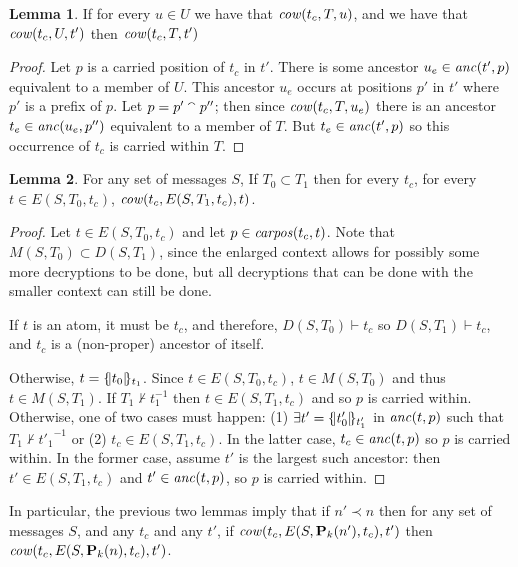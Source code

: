 \documentclass[12pt]{article}
\theoremstyle{definition}
\newtheorem{lem}{Lemma}[section]
\newcommand{\pubmsg}{\mathbf{P}}
\newcommand{\anc}{\fn{anc}}
\newcommand{\mcow}{\fn{cow}}
\begin{document}
\begin{lem}
\label{lem:cowtrans}
If for every $u \in U$ we have that $\mcow(t_c,T,u)$, and we have that $\mcow(t_c,U,t')$ then $\mcow(t_c,T,t')$
\end{lem}

\begin{proof}
Let $p$ is a carried position of $t_c$ in $t'$.  There is some ancestor $u_e \in \anc(t',p)$ equivalent to
a member of $U$.  This ancestor $u_e$ occurs at positions $p'$ in $t'$ where $p'$ is a prefix of $p$.  Let
$p = p' \mathbin{{}^\smallfrown} p''$; then since $\mcow(t_c,T,u_e)$ there is an ancestor $t_e \in \anc(u_e, p'')$ equivalent
to a member of $T$.  But $t_e \in \anc(t',p)$ so this occurrence of $t_c$ is carried within $T$.
\end{proof}

\begin{lem}
\label{lem:escapesetcow}
For any set of messages $S$, If $T_0 \subset T_1$ then for every $t_c$, for every $t \in E(S,T_0,t_c)$,
$\mcow(t_c,E(S,T_1,t_c),t)$.
\end{lem}

\begin{proof}
Let $t \in E(S,T_0,t_c)$ and let $p \in \operatorname{\mathit{carpos}}(t_c,t)$.  Note that $M(S,T_0) \subset D(S,T_1)$,
since the enlarged context allows for possibly some more decryptions to be done, but all decryptions
that can be done with the smaller context can still be done.

If $t$ is an atom, it must be $t_c$, and therefore, $D(S,T_0) \vdash t_c$ so $D(S,T_1) \vdash t_c$,
and $t_c$ is a (non-proper) ancestor of itself.

Otherwise, $t = \{\!|t_0|\!\}_{t_1}$.  Since $t \in E(S,T_0,t_c)$, $t \in M(S,T_0)$ and thus $t \in M(S,T_1)$.
If $T_1 \not\vdash t_1^{-1}$ then $t \in E(S,T_1,t_c)$ and so $p$ is carried within.  Otherwise,
one of two cases must happen: (1) $\exists t' = \{\!|t'_0|\!\}_{t'_1}$ in $\anc(t,p)$ such that $T_1 \not\vdash
{t'_1}^{-1}$ or (2) $t_c \in E(S,T_1,t_c)$.  In the latter case, $t_c \in \anc(t,p)$ so $p$ is carried within.
In the former case, assume $t'$ is the largest such ancestor: then $t' \in E(S,T_1,t_c)$ and $t' \in \anc(t,p)$,
so $p$ is carried within.
\end{proof}

In particular, the previous two lemmas imply that if $n' \prec n$ then for any set of messages $S$,
and any $t_c$ and any $t'$, if $\mcow(t_c, E(S,\pubmsg_k(n'),t_c), t')$ then $\mcow(t_c, E(S,\pubmsg_k(n),t_c), t')$.
\end{document}
